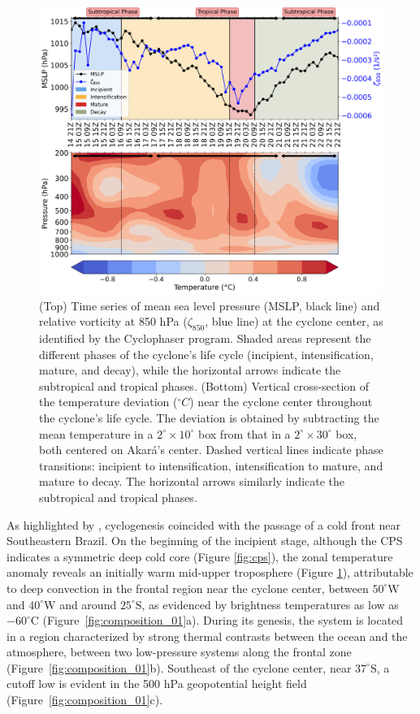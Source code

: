 \documentclass[pdflatex,sn-chicago]{sn-jnl}%
\theoremstyle{plain}
\theoremstyle{definition}
\theoremstyle{remark}
\theoremstyle{definition}
\begin{document}
\begin{figure}[h!]
    \centering
    \includegraphics[width=\textwidth]{combined_serie_zonaldeviation.png}
    \caption{(Top) Time series of mean sea level pressure (MSLP, black line) and relative vorticity at 850 hPa ($\zeta_{850}$, blue line) at the cyclone center, as identified by the Cyclophaser program. Shaded areas represent the different phases of the cyclone's life cycle (incipient, intensification, mature, and decay), while the horizontal arrows indicate the subtropical and tropical phases. (Bottom) Vertical cross-section of the temperature deviation ($^{\circ }C$) near the cyclone center throughout the cyclone's life cycle. The deviation is obtained by subtracting the mean temperature in a $2^\circ\times10^\circ$ box from that in a $2^\circ\times30^\circ$ box, both centered on Akará’s center. Dashed vertical lines indicate phase transitions: incipient to intensification, intensification to mature, and mature to decay. The horizontal arrows similarly indicate the subtropical and tropical phases.}
    \label{fig:combined_serie_zonaldeviation}
\end{figure}

As highlighted by \citet{reboita2024assessment}, cyclogenesis coincided with the passage of a cold front near Southeastern Brazil. On the beginning of the incipient stage, although the CPS indicates a symmetric deep cold core (Figure \ref{fig:cps}), the zonal temperature anomaly reveals an initially warm mid-upper troposphere (Figure \ref{fig:combined_serie_zonaldeviation}), attributable to deep convection in the frontal region near the cyclone center, between $50^{\circ}\mathrm{W}$ and $40^{\circ}\mathrm{W}$ and around $25^{\circ}\mathrm{S}$, as evidenced by brightness temperatures as low as $-60^{\circ}\mathrm{C}$ (Figure~\ref{fig:composition_01}a). During its genesis, the system is located in a region characterized by strong thermal contrasts between the ocean and the atmosphere, between two low-pressure systems along the frontal zone (Figure~\ref{fig:composition_01}b). Southeast of the cyclone center, near $37^{\circ}\mathrm{S}$, a cutoff low is evident in the 500 hPa geopotential height field (Figure~\ref{fig:composition_01}c).
\end{document}
